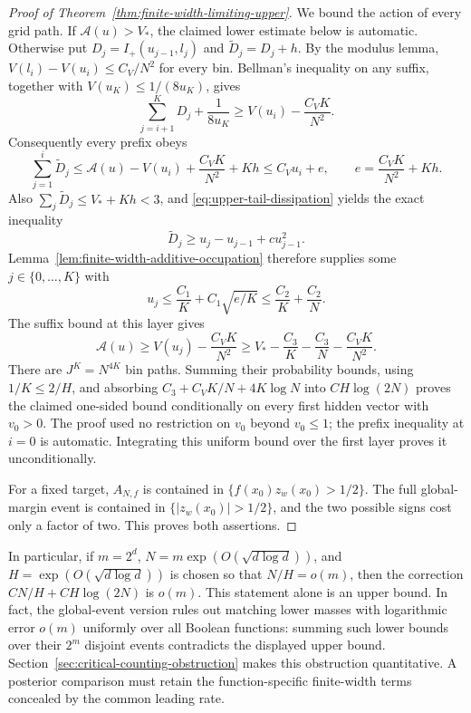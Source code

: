 \begin{proof}[Proof of Theorem~\ref{thm:finite-width-limiting-upper}]
We bound the action of every grid path. If $\mathcal A(u)>V_*$,
the claimed lower estimate below is automatic. Otherwise put
$D_j=I_+(u_{j-1},l_j)$ and $\widetilde D_j=D_j+h$.
By the modulus lemma, $V(l_i)-V(u_i)\le C_V/N^2$ for every bin.
Bellman's inequality on any suffix, together with
$V(u_K)\le1/(8u_K)$, gives
\[
 \sum_{j=i+1}^KD_j+\frac1{8u_K}
 \ge V(u_i)-\frac{C_VK}{N^2}.
\]
Consequently every prefix obeys
\[
 \sum_{j=1}^i\widetilde D_j
 \le\mathcal A(u)-V(u_i)+\frac{C_VK}{N^2}+Kh
 \le C_Vu_i+e,\qquad
 e=\frac{C_VK}{N^2}+Kh.
\]
Also $\sum_j\widetilde D_j\le V_*+Kh<3$, and
\eqref{eq:upper-tail-dissipation} yields the exact inequality
\[
 \widetilde D_j\ge u_j-u_{j-1}+cu_{j-1}^2.
\]
Lemma~\ref{lem:finite-width-additive-occupation} therefore supplies
some $j\in\{0,\ldots,K\}$ with
\[
 u_j\le\frac{C_1}{K}+C_1\sqrt{e/K}
       \le\frac{C_2}{K}+\frac{C_2}{N}.
\]
The suffix bound at this layer gives
\[
 \mathcal A(u)\ge V(u_j)-\frac{C_VK}{N^2}
 \ge V_*-\frac{C_3}{K}-\frac{C_3}{N}
                    -\frac{C_VK}{N^2}.
\]
There are $J^K=N^{4K}$ bin paths. Summing their probability bounds,
using $1/K\le2/H$, and absorbing
$C_3+C_VK/N+4K\log N$ into $CH\log(2N)$ proves the claimed
one-sided bound conditionally on every first hidden vector with
$v_0>0$. The proof used no restriction on $v_0$ beyond $v_0\le1$;
the prefix inequality at $i=0$ is automatic. Integrating this uniform
bound over the first layer proves it unconditionally.

For a fixed target, $A_{N,f}$ is contained in
$\{f(x_0)z_w(x_0)>1/2\}$. The full global-margin event is contained
in $\{|z_w(x_0)|>1/2\}$, and the two possible signs cost only a
factor of two. This proves both assertions.
\end{proof}

In particular, if $m=2^d$, $N=m\exp(O(\sqrt{d\log d}))$, and
$H=\exp(O(\sqrt{d\log d}))$ is chosen so that $N/H=o(m)$,
then the correction $CN/H+CH\log(2N)$ is $o(m)$.
This statement alone is an upper bound. In fact, the global-event
version rules out matching lower masses with logarithmic error $o(m)$
uniformly over all Boolean functions: summing such lower bounds over
their $2^m$ disjoint events contradicts the displayed upper bound.
Section~\ref{sec:critical-counting-obstruction} makes this obstruction
quantitative. A posterior comparison must retain the function-specific
finite-width terms concealed by the common leading rate.
